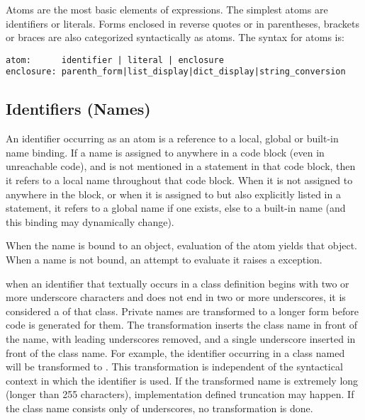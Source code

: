 Atoms are the most basic elements of expressions.  The simplest atoms
are identifiers or literals.  Forms enclosed in
reverse quotes or in parentheses, brackets or braces are also
categorized syntactically as atoms.  The syntax for atoms is:

\begin{verbatim}
atom:      identifier | literal | enclosure
enclosure: parenth_form|list_display|dict_display|string_conversion
\end{verbatim}

\subsection{Identifiers (Names)\label{atom-identifiers}}

An identifier occurring as an atom is a reference to a local, global
or built-in name binding.  If a name is assigned to anywhere in a code
block (even in unreachable code), and is not mentioned in a
 statement in that code block, then it refers to a local
name throughout that code block.  When it is not assigned to anywhere
in the block, or when it is assigned to but also explicitly listed in
a  statement, it refers to a global name if one exists,
else to a built-in name (and this binding may dynamically change).

When the name is bound to an object, evaluation of the atom yields
that object.  When a name is not bound, an attempt to evaluate it
raises a  exception.

%
%
%
when an identifier that textually occurs in a class definition begins
with two or more underscore characters and does not end in two or more
underscores, it is considered a  of that class.
Private names are transformed to a longer form before code is
generated for them.  The transformation inserts the class name in
front of the name, with leading underscores removed, and a single
underscore inserted in front of the class name.  For example, the
identifier  occurring in a class named  will be
transformed to .  This transformation is independent
of the syntactical context in which the identifier is used.  If the
transformed name is extremely long (longer than 255 characters),
implementation defined truncation may happen.  If the class name
consists only of underscores, no transformation is done.


